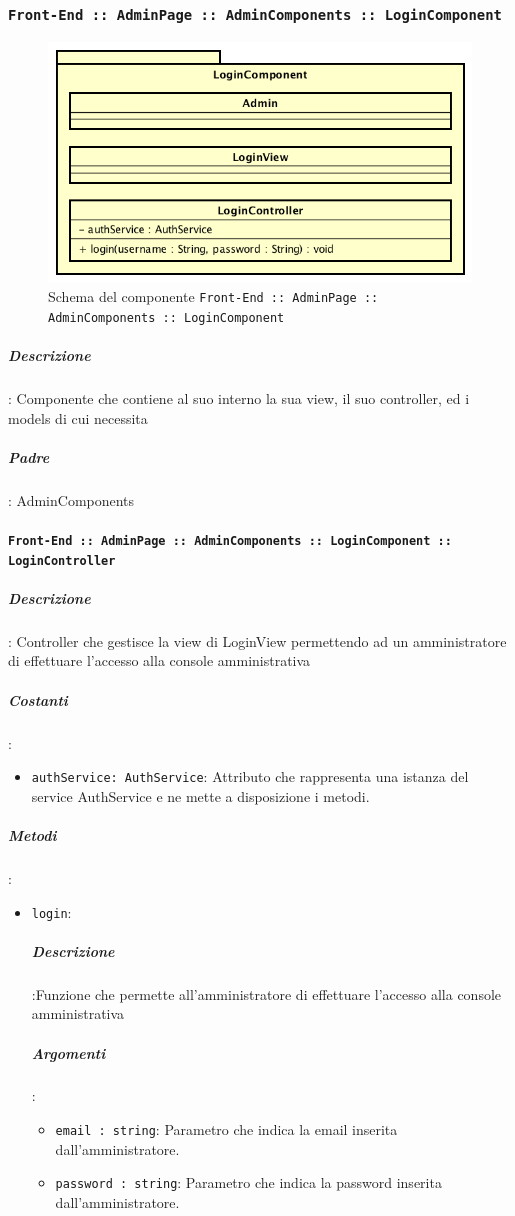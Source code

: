 \documentclass[../DefinizioneDiProdotto_v2.0.0.tex]{subfiles}
\begin{document}
\newpage
	\subsubsection{\texttt{Front-End :: AdminPage :: AdminComponents :: LoginComponent}}
	\begin{figure}[!h]
		\centering
		\includegraphics[scale=0.6]{Architettura/Front-End/AdminPage/AdminComponents/LoginComponent.png}
		\caption{Schema del componente \texttt{Front-End :: AdminPage :: AdminComponents :: LoginComponent}}
	\end{figure}
			\subparagraph{Descrizione}: Componente che contiene al suo interno la sua view, il suo controller, ed i models di cui necessita
			\subparagraph{Padre}: AdminComponents
			\paragraph{\texttt{Front-End :: AdminPage :: AdminComponents :: LoginComponent :: LoginController}}
				\subparagraph{Descrizione}: Controller che gestisce la view di LoginView permettendo ad un amministratore di effettuare l'accesso alla console amministrativa
				\subparagraph{Costanti}:
				\begin{itemize}
					\item \texttt{authService: AuthService}: Attributo che rappresenta una istanza del service AuthService e ne mette a disposizione i metodi.
				\end{itemize}
				\subparagraph{Metodi}:
				\begin{itemize}
					\item \texttt{login}:
					\subparagraph{Descrizione}:Funzione che permette all'amministratore di effettuare l'accesso alla console amministrativa
					\subparagraph{Argomenti}:
					\begin{itemize}
						\item \texttt{email : string}: Parametro che indica la email inserita dall'amministratore.
						\item \texttt{password : string}: Parametro che indica la password inserita dall'amministratore.
					\end{itemize}
				\end{itemize}\vspace{0.5em}
\end{document}
